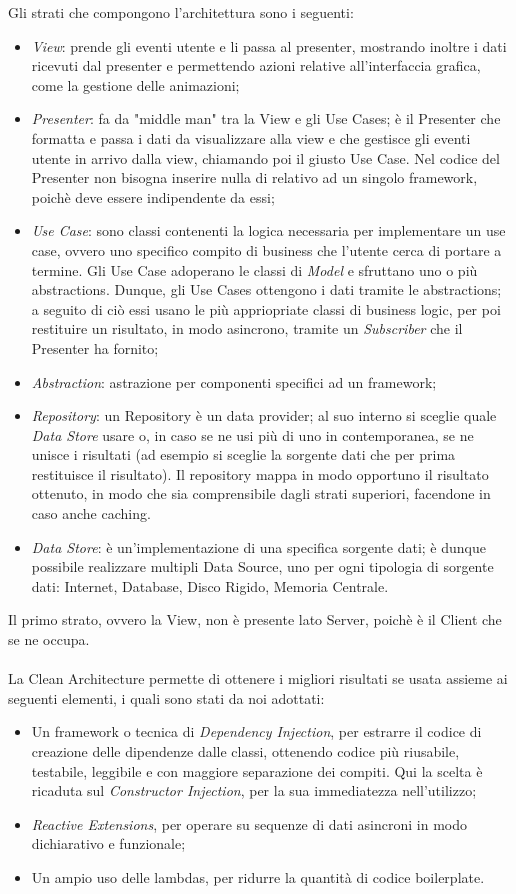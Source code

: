 Gli strati che compongono l'architettura sono i seguenti:
\begin{itemize}
    \item \textit{View}: prende gli eventi utente e li passa al presenter, mostrando inoltre i dati ricevuti dal presenter e permettendo
    azioni relative all'interfaccia grafica, come la gestione delle animazioni;
    \item \textit{Presenter}: fa da "middle man" tra la View e gli Use Cases; è il Presenter che formatta e passa i dati da visualizzare alla view e che gestisce gli eventi utente in arrivo dalla view, chiamando poi il giusto Use Case. Nel codice del Presenter non bisogna inserire nulla di relativo ad un singolo framework, poichè deve essere indipendente da essi;
    \item \textit{Use Case}: sono classi contenenti la logica necessaria per implementare un use case, ovvero uno specifico compito di business che l'utente cerca di portare a termine. Gli Use Case adoperano le classi di \textit{Model} e sfruttano uno o più abstractions. Dunque, gli Use Cases 
    ottengono i dati tramite le abstractions; a seguito di ciò essi usano le più appriopriate classi di business logic, per poi restituire un risultato, in modo asincrono, tramite un \textit{Subscriber} che il Presenter ha fornito;
    \item \textit{Abstraction}: astrazione per componenti specifici ad un framework;
    \item \textit{Repository}: un Repository è un data provider; al suo interno si sceglie quale \textit{Data Store} usare o, in caso se ne usi più di uno in contemporanea, se ne unisce i risultati (ad esempio si sceglie la sorgente dati che per prima restituisce il risultato). Il repository mappa in modo opportuno il risultato ottenuto, in modo che sia comprensibile dagli strati superiori, facendone in caso anche caching.
     \item \textit{Data Store}: è un'implementazione di una specifica sorgente dati; è dunque possibile realizzare multipli Data Source, uno per ogni tipologia di sorgente dati: Internet, Database, Disco Rigido, Memoria Centrale.
\end{itemize}
Il primo strato, ovvero la View, non è presente lato Server, poichè è il Client che se ne occupa.
\\
\\
La Clean Architecture permette di
ottenere i migliori risultati se usata assieme ai seguenti elementi, i quali sono stati da noi adottati:
\begin{itemize}
\item Un framework o tecnica di \textit{Dependency Injection}, per estrarre il codice di creazione delle dipendenze dalle classi, ottenendo codice più riusabile, testabile, leggibile e con maggiore separazione dei compiti. Qui la scelta è ricaduta sul \textit{Constructor Injection}, per la sua immediatezza nell'utilizzo;
\item \textit{Reactive Extensions}, per operare su sequenze di dati asincroni in modo dichiarativo e funzionale;
\item Un ampio uso delle lambdas, per ridurre la quantità di codice boilerplate.
\end{itemize}

